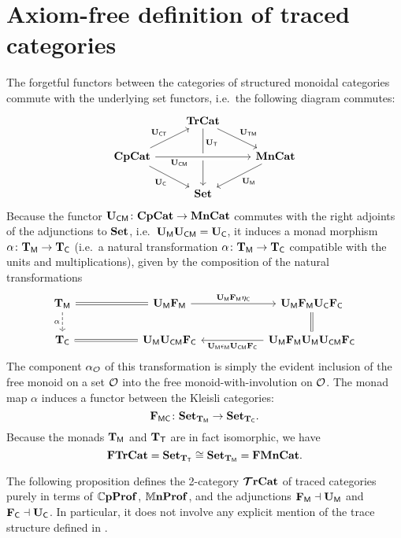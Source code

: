 \documentclass[11pt,oneside,article]{memoir}
\begin{document}
\section{Axiom-free definition of traced categories}
      \label{sec:characterization_of_traced}
      The forgetful functors between the categories of structured monoidal categories commute with the
underlying set functors, i.e.\ the following diagram commutes:
\begin{equation}
   \label{eqn:tetrahedron}
   \begin{tikzcd}
      & \TrCat \ar[dr,"\UTM"] \ar[dd,"\UT" near start] & \\
      \CompCat \ar[rr,crossing over,"\UCM"' near start] \ar[dr,"\UC"'] \ar[ru,"\UCT"]
         && \MonCat \ar[dl,"\UM"] \\
      & \Set &
   \end{tikzcd}
\end{equation}
Because the functor $\mathbf{U}_{\mathsf{CM}}\colon\mathbf{CpCat}\to\mathbf{MnCat}$ commutes with the right adjoints of the
adjunctions to $\mathbf{Set}$, i.e.\ $\mathbf{U}_{\mathsf{M}}\mathbf{U}_{\mathsf{CM}}=\mathbf{U}_{\mathsf{C}}$, it induces a monad morphism $\alpha\colon\mathbf{T}_{\mathsf{M}}\to\mathbf{T}_{\mathsf{C}}$
(i.e.\ a natural transformation $\alpha\colon\mathbf{T}_{\mathsf{M}}\to\mathbf{T}_{\mathsf{C}}$ compatible with the units and
multiplications), given by the composition of the natural transformations
\begin{equation*} \begin{tikzcd}[column sep=2cm]
   \TM\ar[r,equal]\ar[d,dashed,"\alpha"']&\UM\FM\ar[r,"\UM\FM\eta_{\MTCfont{C}}"]&\UM\FM\UC\FC\ar[d,equal]\\
   \TC&\UM\UCM\FC\ar[l,equal]&\UM\FM\UM\UCM\FC\ar[l,"\UM\epsilon_{\MTCfont{M}}\UCM\FC"]
\end{tikzcd} \end{equation*}
The component $\alpha_{\mathcal{O}}$ of this transformation is simply the evident inclusion of the free
monoid on a set $\mathcal{O}$ into the free monoid-with-involution on $\mathcal{O}$. The monad map $\alpha$ induces a functor between the Kleisli categories:
\begin{equation*}
      \label{eqn:FMC}
   \mathbf{F}_{\mathsf{MC}}\colon\mathbf{Set}_{\mathbf{T}_{\mathsf{M}}}\to\mathbf{Set}_{\mathbf{T}_{\mathsf{C}}}.
\end{equation*}
   Because the monads $\mathbf{T}_{\mathsf{M}}$ and $\mathbf{T}_{\mathsf{T}}$ are in fact isomorphic, we have
   \[
      \mathbf{FTrCat} = \mathbf{Set}_{\mathbf{T}_{\mathsf{T}}} \cong \mathbf{Set}_{\mathbf{T}_{\mathsf{M}}} = \mathbf{FMnCat}.
   \]

The following proposition defines the 2-category $\bm{\mathcal{T}}\mathbf{rCat}$ of traced categories purely in terms of $\mathbb{C}\mathbf{pProf}$, $\mathbb{M}\mathbf{nProf}$, and
   the adjunctions $\mathbf{F}_{\mathsf{M}}\dashv\mathbf{U}_{\mathsf{M}}$ and $\mathbf{F}_{\mathsf{C}}\dashv\mathbf{U}_{\mathsf{C}}$. In particular, it does not involve any explicit
   mention of the trace structure defined in \cite{JoyalStreetVerity}.
   
\end{document}
